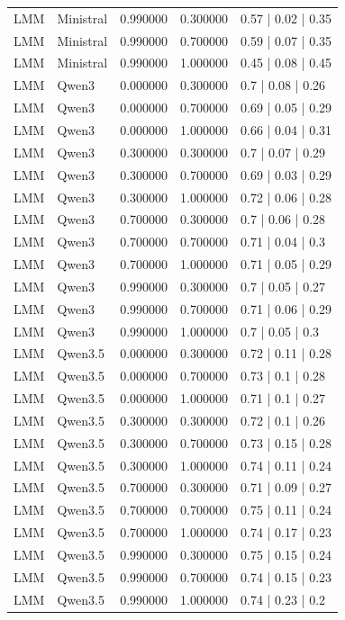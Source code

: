 \begin{longtable}{lllll}
LMM & Ministral & 0.990000 & 0.300000 & 0.57 | 0.02 | 0.35 \\
LMM & Ministral & 0.990000 & 0.700000 & 0.59 | 0.07 | 0.35 \\
LMM & Ministral & 0.990000 & 1.000000 & 0.45 | 0.08 | 0.45 \\
LMM & Qwen3 & 0.000000 & 0.300000 & 0.7 | 0.08 | 0.26 \\
LMM & Qwen3 & 0.000000 & 0.700000 & 0.69 | 0.05 | 0.29 \\
LMM & Qwen3 & 0.000000 & 1.000000 & 0.66 | 0.04 | 0.31 \\
LMM & Qwen3 & 0.300000 & 0.300000 & 0.7 | 0.07 | 0.29 \\
LMM & Qwen3 & 0.300000 & 0.700000 & 0.69 | 0.03 | 0.29 \\
LMM & Qwen3 & 0.300000 & 1.000000 & 0.72 | 0.06 | 0.28 \\
LMM & Qwen3 & 0.700000 & 0.300000 & 0.7 | 0.06 | 0.28 \\
LMM & Qwen3 & 0.700000 & 0.700000 & 0.71 | 0.04 | 0.3 \\
LMM & Qwen3 & 0.700000 & 1.000000 & 0.71 | 0.05 | 0.29 \\
LMM & Qwen3 & 0.990000 & 0.300000 & 0.7 | 0.05 | 0.27 \\
LMM & Qwen3 & 0.990000 & 0.700000 & 0.71 | 0.06 | 0.29 \\
LMM & Qwen3 & 0.990000 & 1.000000 & 0.7 | 0.05 | 0.3 \\
LMM & Qwen3.5 & 0.000000 & 0.300000 & 0.72 | 0.11 | 0.28 \\
LMM & Qwen3.5 & 0.000000 & 0.700000 & 0.73 | 0.1 | 0.28 \\
LMM & Qwen3.5 & 0.000000 & 1.000000 & 0.71 | 0.1 | 0.27 \\
LMM & Qwen3.5 & 0.300000 & 0.300000 & 0.72 | 0.1 | 0.26 \\
LMM & Qwen3.5 & 0.300000 & 0.700000 & 0.73 | 0.15 | 0.28 \\
LMM & Qwen3.5 & 0.300000 & 1.000000 & 0.74 | 0.11 | 0.24 \\
LMM & Qwen3.5 & 0.700000 & 0.300000 & 0.71 | 0.09 | 0.27 \\
LMM & Qwen3.5 & 0.700000 & 0.700000 & 0.75 | 0.11 | 0.24 \\
LMM & Qwen3.5 & 0.700000 & 1.000000 & 0.74 | 0.17 | 0.23 \\
LMM & Qwen3.5 & 0.990000 & 0.300000 & 0.75 | 0.15 | 0.24 \\
LMM & Qwen3.5 & 0.990000 & 0.700000 & 0.74 | 0.15 | 0.23 \\
LMM & Qwen3.5 & 0.990000 & 1.000000 & 0.74 | 0.23 | 0.2 \\

\end{longtable}
